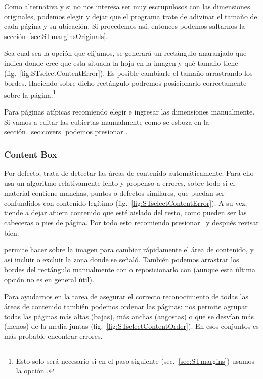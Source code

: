 \documentclass[%
	a5paper,
	10pt,
	twoside,
	openright,
	final,
]{memoir}
\begin{document}
{	Como alternativa y si no nos interesa ser muy escrupulosos con las dimensiones originales, podemos elegir  y dejar que el programa trate de adivinar el tamaño de cada página y su ubicación. Si procedemos así, entonces podemos saltarnos la sección~\ref{sec:STmarginsOriginals}.

	Sea cual sea la opción que elijamos, se generará un rectángulo anaranjado que indica donde \scantailor cree que esta situada la hoja en la imagen y qué tamaño tiene (fig.~\ref{fig:STselectContentError}). Es posible cambiarle el tamaño arrastrando los bordes. Haciendo  sobre dicho rectángulo podremos posicionarlo correctamente sobre la página.\footnote{Esto solo será necesario si en el paso siguiente (sec.~\ref{sec:STmargins}) usamos la opción .}

	Para páginas atípicas recomiendo elegir  e ingresar las dimensiones manualmente. Si vamos a editar las cubiertas manualmente como se esboza en la sección~\ref{sec:covers} podemos presionar .

	\subsubsection{Content Box} Por defecto, \scantailor trata de detectar las áreas de contenido automáticamente. Para ello usa un algoritmo relativamente lento y propenso a errores, sobre todo si el material contiene manchas, puntos o defectos similares, que puedan ser confundidos con contenido legítimo (fig.~\ref{fig:STselectContentError}). A su vez, tiende a dejar afuera contenido que esté aislado del resto, como pueden ser las cabeceras o pies de página. Por todo esto recomiendo presionar \play\ y después revisar bien.

	\scantailorAdvanced permite hacer \menu{\leftclick\,\leftclick} sobre la imagen para cambiar rápidamente el área de contenido, y así incluir o excluir la zona donde se señaló. También podemos arrastrar los bordes del rectángulo manualmente con  o reposicionarlo con  (aunque esta última opción no es en general útil).

	Para ayudarnos en la tarea de asegurar el correcto reconocimiento de todas las áreas de contenido también podemos ordenar las páginas:  nos permite agrupar todas las páginas más altas (bajas), más anchas (angostas) o que se desvían más (menos) de la media juntas (fig.~\ref{fig:STselectContentOrder}). En esos conjuntos es más probable encontrar errores.

}
\end{document}
